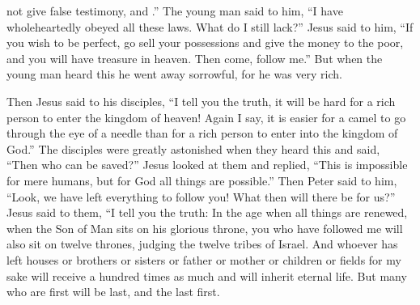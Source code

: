 {{{not
give false testimony,}}
and
{}.”
The young man
said
to him,
“I have wholeheartedly obeyed
all
these
laws. What
do I
still
lack?”
Jesus
said
to him,
“If
you wish
to be
perfect,
go
sell
your
possessions
and
give
the money to the poor,
and
you will have
treasure
in
heaven.
Then
come,
follow
me.”
But
when
the young man
heard
this
he went away
sorrowful,
for
he was
very
rich.
\par }{\PP {}Then Jesus
said
to his
disciples,
“I tell
you
the truth,
it will be hard
for a rich person
to enter
the kingdom
of heaven!
Again
I say,
it is
easier
for a camel
to go through
the eye
of a needle
than
for a rich person
to enter
into
the kingdom
of God.”
The disciples
were
greatly
astonished
when they heard
this and said,
“Then
who
can
be saved?”
Jesus
looked at
them
and replied,
“This
is
impossible
for
mere humans,
but
for
God
all things
are possible.”
Then
Peter
said
to him,
“Look,
we
have left
everything
to follow
you! What
then
will there be
for us?”
Jesus
said
to them,
“I tell
you
the truth: In
the age
when
all things are renewed, when the Son
of Man
sits
on
his
glorious
throne,
you
who have followed
me
will
also
sit
on
twelve
thrones,
judging
the twelve
tribes
of Israel.
And
whoever
has left
houses
or
brothers
or
sisters
or
father
or
mother
or
children
or
fields
for
my
sake
will receive
a hundred times
as much and
will inherit
eternal
life.
But
many
who are first
will be
last,
and
the last
first.

}
